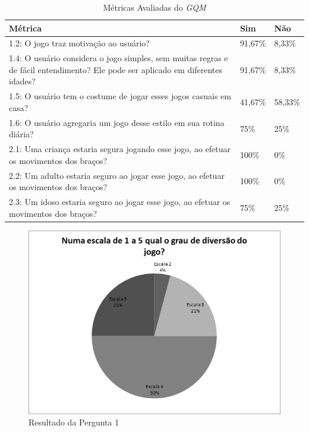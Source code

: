 \begin{table}[h]
\caption{Métricas Avaliadas do \textit{GQM}}
\centering
\begin{tabular}{|p{10cm}|p{1.2cm}|p{1.2cm}|}
\hline
\textbf{Métrica} & \textbf{Sim} & \textbf{Não} \\ \hline
1.2: O jogo traz motivação ao usuário? & 91,67\% & 8,33\% \\ \hline
1.4: O usuário considera o jogo simples, sem muitas regras e de fácil entendimento? Ele pode ser aplicado em diferentes idades? & 91,67\% & 8,33\% \\ \hline
1.5: O usuário tem o costume de jogar esses jogos casuais em casa? & 41,67\% & 58,33\% \\ \hline
1.6: O usuário agregaria um jogo desse estilo em sua rotina diária? & 75\% & 25\% \\ \hline
2.1: Uma criança estaria segura jogando esse jogo, ao efetuar os movimentos dos braços? & 100\% & 0\% \\ \hline
2.2: Um adulto estaria seguro ao jogar esse jogo, ao efetuar os movimentos dos braços? & 100\% & 0\% \\ \hline
2.3: Um idoso estaria seguro ao jogar esse jogo, ao efetuar os movimentos dos braços? & 75\% & 25\% \\ \hline
\end{tabular}
\label{table:resultados_gqm}
\end{table}

\begin{figure}[!htb]
     \centering
     \includegraphics[scale=0.7]{./img/chart_1-.png}
     \caption{Resultado da Pergunta 1}
     \label{fig:question1}
\end{figure}



